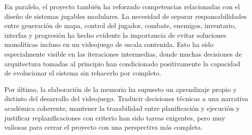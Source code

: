 En paralelo, el proyecto también ha reforzado competencias relacionadas con el diseño de
sistemas jugables modulares. La necesidad de separar responsabilidades entre generación de
mapa, control del jugador, combate, enemigos, inventario, interfaz y progresión ha hecho
evidente la importancia de evitar soluciones monolíticas incluso en un videojuego de escala
contenida. Esto ha sido especialmente visible en las iteraciones intermedias, donde muchas
decisiones de arquitectura tomadas al principio han condicionado positivamente la capacidad
de evolucionar el sistema sin rehacerlo por completo.

Por último, la elaboración de la memoria ha supuesto un aprendizaje propio y distinto del
desarrollo del videojuego. Traducir decisiones técnicas a una narrativa académica coherente,
mantener la trazabilidad entre planificación y ejecución y justificar replanificaciones con
criterio han sido tareas exigentes, pero muy valiosas para cerrar el proyecto con una
perspectiva más completa.
